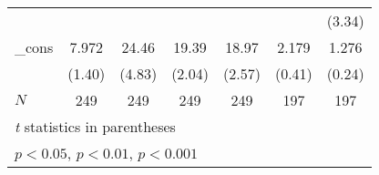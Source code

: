 {\begin{tabular}{l*{6}{c}}
            &                     &                     &                     &                     &                     &      (3.34)         \\
[1em]
\_cons      &       7.972         &       24.46\sym{***}&       19.39\sym{*}  &       18.97\sym{*}  &       2.179         &       1.276         \\
            &      (1.40)         &      (4.83)         &      (2.04)         &      (2.57)         &      (0.41)         &      (0.24)         \\
\hline
\(N\)       &         249         &         249         &         249         &         249         &         197         &         197         \\
\hline\hline
\multicolumn{7}{l}{\footnotesize \textit{t} statistics in parentheses}\\
\multicolumn{7}{l}{\footnotesize \sym{*} \(p<0.05\), \sym{**} \(p<0.01\), \sym{***} \(p<0.001\)}\\
\end{tabular}
}
